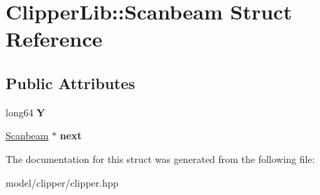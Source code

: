 \hypertarget{structClipperLib_1_1Scanbeam}{\section{Clipper\-Lib\-:\-:Scanbeam Struct Reference}
\label{structClipperLib_1_1Scanbeam}
}
\subsection*{Public Attributes}
\begin{DoxyCompactItemize}
\item 
\hypertarget{structClipperLib_1_1Scanbeam_a71e4ab9957d1039c6d6666b92236fb71}{long64 {\bfseries Y}}\label{structClipperLib_1_1Scanbeam_a71e4ab9957d1039c6d6666b92236fb71}

\item 
\hypertarget{structClipperLib_1_1Scanbeam_a7e77b169ceff6cd0e079dd0e0b5760e8}{\hyperlink{structClipperLib_1_1Scanbeam}{Scanbeam} $\ast$ {\bfseries next}}\label{structClipperLib_1_1Scanbeam_a7e77b169ceff6cd0e079dd0e0b5760e8}

\end{DoxyCompactItemize}


The documentation for this struct was generated from the following file\-:\begin{DoxyCompactItemize}
\item 
model/clipper/clipper.\-hpp\end{DoxyCompactItemize}
